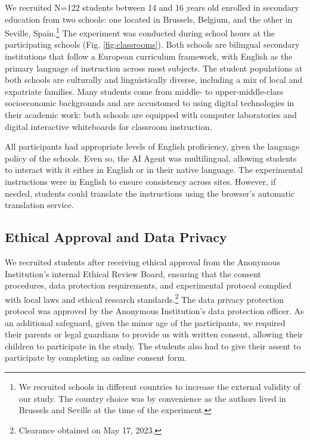 \documentclass[
  11pt,
]{article}
\begin{document}
We recruited N=122 students between 14 and 16 years old enrolled in secondary education from two schools: one located in Brussels, Belgium, and the other in Seville, Spain.\footnote{We recruited schools in different countries to increase the external validity of our study. The country choice was by convenience as the authors lived in Brussels and Seville at the time of the experiment.} The experiment was conducted during school hours at the participating schools (Fig. \ref{fig:classrooms}). Both schools are bilingual secondary institutions that follow a European curriculum framework, with English as the primary language of instruction across most subjects. The student populations at both schools are culturally and linguistically diverse, including a mix of local and expatriate families. Many students come from middle- to upper-middle-class socioeconomic backgrounds and are accustomed to using digital technologies in their academic work: both schools are equipped with computer laboratories and digital interactive whiteboards for classroom instruction.

All participants had appropriate levels of English proficiency, given the language policy of the schools. Even so, the AI Agent was multilingual, allowing students to interact with it either in English or in their native language. The experimental instructions were in English to ensure consistency across sites. However, if needed, students could translate the instructions using the browser's automatic translation service.

\subsection{Ethical Approval and Data Privacy}\label{ethical-approval-and-data-privacy}

We recruited students after receiving ethical approval from the Anonymous Institution's internal Ethical Review Board, ensuring that the consent procedures, data protection requirements, and experimental protocol complied with local laws and ethical research standards.\footnote{Clearance obtained on May 17, 2023.} The data privacy protection protocol was approved by the Anonymous Institution's data protection officer. As an additional safeguard, given the minor age of the participants, we required their parents or legal guardians to provide us with written consent, allowing their children to participate in the study. The students also had to give their assent to participate by completing an online consent form.
\end{document}
